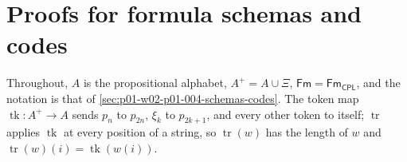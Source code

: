 \section{Proofs for formula schemas and codes}
\label{sec:annex-p01-w02-p01-004-schemas-codes}

Throughout, \(A\) is the propositional alphabet, \(A^{+}=A\cup\Xi\),
\(\mathsf{Fm}=\mathsf{Fm}_{\mathsf{CPL}}\), and the notation is that of
\cref{sec:p01-w02-p01-004-schemas-codes}. The token map
\(\operatorname{tk}:A^{+}\to A\) sends \(p_n\) to \(p_{2n}\), \(\xi_k\) to \(p_{2k+1}\), and
every other token to itself; \(\operatorname{tr}\) applies \(\operatorname{tk}\) at every
position of a string, so \(\operatorname{tr}(w)\) has the length of \(w\) and
\(\operatorname{tr}(w)(i)=\operatorname{tk}(w(i))\).


